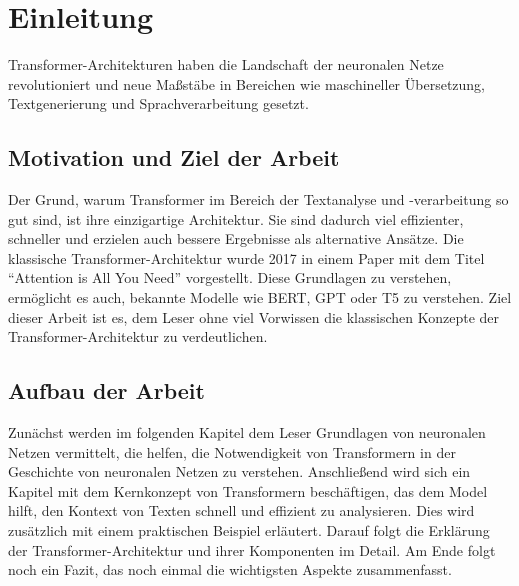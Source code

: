 \chapter{Einleitung}

Transformer-Architekturen haben die Landschaft der neuronalen Netze revolutioniert und neue Maßstäbe in Bereichen wie maschineller Übersetzung, Textgenerierung und Sprachverarbeitung gesetzt.  

\section{Motivation und Ziel der Arbeit}

Der Grund, warum Transformer im Bereich der Textanalyse und -verarbeitung so gut sind, ist ihre einzigartige Architektur.  
Sie sind dadurch viel effizienter, schneller und erzielen auch bessere Ergebnisse als alternative Ansätze.  
Die klassische Transformer-Architektur wurde 2017 in einem Paper mit dem Titel \enquote{Attention is All You Need} vorgestellt.  
Diese Grundlagen zu verstehen, ermöglicht es auch, bekannte Modelle wie BERT, GPT oder T5 zu verstehen.  
Ziel dieser Arbeit ist es, dem Leser ohne viel Vorwissen die klassischen Konzepte der Transformer-Architektur zu verdeutlichen.  

\section{Aufbau der Arbeit}

Zunächst werden im folgenden Kapitel dem Leser Grundlagen von neuronalen Netzen vermittelt, die helfen, die Notwendigkeit von Transformern in der Geschichte von neuronalen Netzen zu verstehen.  
Anschließend wird sich ein Kapitel mit dem Kernkonzept von Transformern beschäftigen, das dem Model hilft, den Kontext von Texten schnell und effizient zu analysieren.  
Dies wird zusätzlich mit einem praktischen Beispiel erläutert.  
Darauf folgt die Erklärung der Transformer-Architektur und ihrer Komponenten im Detail.  
Am Ende folgt noch ein Fazit, das noch einmal die wichtigsten Aspekte zusammenfasst.  
